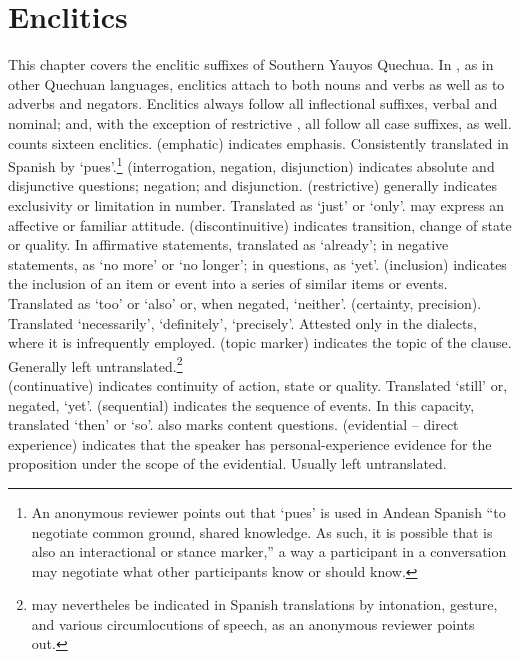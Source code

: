 \chapter{Enclitics}\label{ch:enclitics}
This chapter covers the enclitic suffixes of Southern Yauyos Quechua. In \SYQ{}, as in other Quechuan languages, enclitics attach to both nouns and verbs as well as to adverbs and negators. Enclitics always follow all inflectional suffixes, verbal and nominal; and, with the exception of restrictive , all follow all case suffixes, as well. \SYQ{} counts sixteen enclitics.  (emphatic) indicates emphasis. Consistently translated in Spanish by `pues'.\footnote{An anonymous reviewer points out that `pues' is used in Andean Spanish ``to negotiate common ground, shared knowledge. As such, it is possible that  is also an interactional or stance marker,'' a way a participant in a conversation may negotiate what other participants know or should know.}  (interrogation, negation, disjunction) indicates absolute and disjunctive questions; negation; and disjunction.  (restrictive) generally indicates exclusivity or limitation in number. Translated as `just' or `only'.  may express an affective or familiar attitude.  (discontinuitive) indicates transition, change of state or quality. In affirmative statements, translated as `already'; in negative statements, as `no more' or `no longer'; in questions, as `yet'.  (inclusion) indicates the inclusion of an item or event into a series of similar items or events. Translated as `too' or `also' or, when negated, `neither'.  (certainty, precision). Translated `necessarily', `definitely', `precisely'. Attested only in the \QII{} dialects, where it is infrequently employed.  (topic marker) indicates the topic of the clause. Generally left untranslated.\footnote{ may nevertheles be indicated in Spanish translations by intonation, gesture, and various circumlocutions of speech, as an anonymous reviewer points out.}\\
 (continuative) indicates continuity of action, state or quality. Translated `still' or, negated, `yet'.  (sequential) indicates the sequence of events. In this capacity, translated `then' or `so'.  also marks content questions.  (evidential -- direct experience) indicates that the speaker has personal-experience evidence for the proposition under the scope of the evidential. Usually left untranslated.\\
